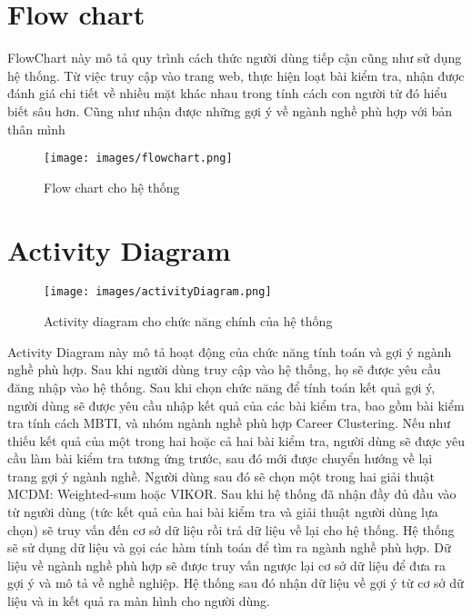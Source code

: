 \newpage 

\section{Flow chart}
FlowChart này mô tả quy trình cách thức người dùng tiếp cận cũng như sử dụng hệ thống.
Từ việc truy cập vào trang web, thực hiện loạt bài kiểm tra, nhận được đánh giá chi tiết về nhiều mặt khác nhau
trong tính cách con người từ đó hiểu biết sâu hơn. Cũng như nhận được những gợi ý về ngành nghề phù hợp với bản thân mình

\begin{figure}[H]
    \centering
    \texttt{[image: images/flowchart.png]}
    \vspace{0.5cm}
    \caption{Flow chart cho hệ thống }
\end{figure}

\section{Activity Diagram}

\begin{figure}[H]
    \centering
    \texttt{[image: images/activityDiagram.png]}
    \vspace{0.5cm}
    \caption{Activity diagram cho chức năng chính của hệ thống }
\end{figure}

Activity Diagram này mô tả hoạt động của chức năng tính toán và gợi ý ngành nghề phù hợp. Sau khi người dùng truy cập vào hệ thống, họ sẽ được yêu cầu đăng nhập vào hệ thống. Sau khi chọn chức năng để tính toán kết quả gợi ý, người dùng sẽ được yêu cầu nhập kết quả của các bài kiểm tra, bao gồm bài kiểm tra tính cách MBTI, và nhóm ngành nghề phù hợp Career Clustering. Nếu như thiếu kết quả của một trong hai hoặc cả hai bài kiểm tra, người dùng sẽ được yêu cầu làm bài kiểm tra tương ứng trước, sau đó mới được chuyển hướng về lại trang gợi ý ngành nghề. Người dùng sau đó sẽ chọn một trong hai giải thuật MCDM: Weighted-sum hoặc VIKOR. Sau khi hệ thống đã nhận đầy đủ đầu vào từ người dùng (tức kết quả của hai bài kiểm tra và giải thuật người dùng lựa chọn) sẽ truy vấn đến cơ sở dữ liệu rồi trả dữ liệu về lại cho hệ thống. Hệ thống sẽ sử dụng dữ liệu và gọi các hàm tính toán để tìm ra ngành nghề phù hợp. Dữ liệu về ngành nghề phù hợp sẽ được truy vấn ngược lại cơ sở dữ liệu để đưa ra gợi ý và mô tả về nghề nghiệp. Hệ thống sau đó nhận dữ liệu về gợi ý từ cơ sở dữ liệu và in kết quả ra màn hình cho người dùng.
